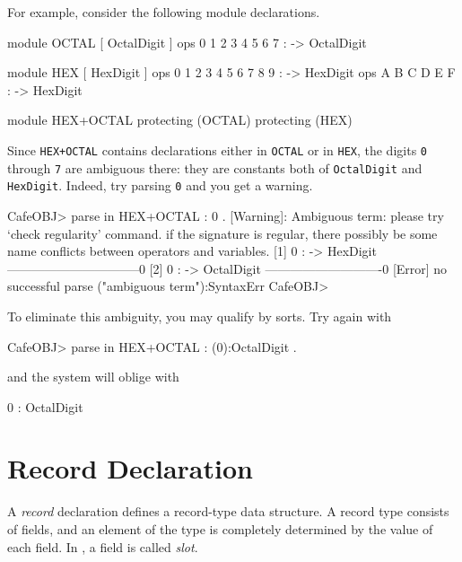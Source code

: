\documentclass[a4paper]{memoir}
\begin{document}
For example, consider the following module declarations.
\begin{vvtm}
\begin{ccode}
  module OCTAL {
    [ OctalDigit ]
    ops 0 1 2 3 4 5 6 7 : -> OctalDigit
  }

  module HEX {
    [ HexDigit ]
    ops 0 1 2 3 4 5 6 7 8 9 : -> HexDigit
    ops A B C D E F : -> HexDigit
  }

  module HEX+OCTAL {
    protecting (OCTAL)
    protecting (HEX)
  }
\end{ccode}
\end{vvtm}
Since \verb|HEX+OCTAL| contains declarations either in \verb|OCTAL| or in
\verb|HEX|, the digits \verb|0| through \verb|7| are ambiguous there:
they are constants both of \verb|OctalDigit| and \verb|HexDigit|.
Indeed, try parsing \verb|0| and you get a warning.
\begin{vvtm}
\begin{ccode}
  CafeOBJ> parse in HEX+OCTAL : 0 .
  [Warning]: Ambiguous term:
      please try `check regularity' command.
      if the signature is regular, there possibly be 
      some name conflicts between operators and variables.
  [1] 0 :  -> HexDigit --------------------------------0
  [2] 0 :  -> OctalDigit ----------------------------0
  [Error] no successful parse
    ("ambiguous term"):SyntaxErr
  CafeOBJ> 
\end{ccode}
\end{vvtm}
To eliminate this ambiguity, you may qualify by sorts. Try again with
\begin{vvtm}
\begin{ccode}
  CafeOBJ> parse in HEX+OCTAL : (0):OctalDigit .
\end{ccode}
\end{vvtm}
and the system will oblige with
\begin{vvtm}
\begin{ccode}
  0 : OctalDigit
\end{ccode}
\end{vvtm}
\section{Record Declaration}\label{sec:p2-record-declaration}

A {\em record} declaration defines a record-type
data structure. A record type consists of fields, and an element of the
type is completely determined by the value of each field.
In \cafeobj, a field is called {\em slot}.
\end{document}
